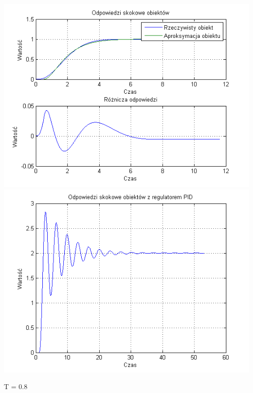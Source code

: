 \documentclass[10pt,a4paper]{article}
\begin{document}
\begin{center}
\includegraphics[scale=1]{images/dwa/skrypt_259.png}\\
\includegraphics[scale=1]{images/dwa/skrypt_260.png}\\
\end{center}
\newpage
T = 0.8
\end{document}
